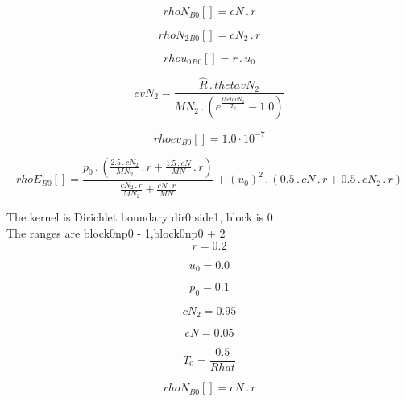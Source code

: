 \documentclass{article}
\begin{document}
\begin{dmath}{rhoN{_{B0}}}[{}] = cN \,.\, r\end{dmath}

\begin{dmath}{rhoN_{2}{_{B0}}}[{}] = cN_{2} \,.\, r\end{dmath}

\begin{dmath}{rhou_{0}{_{B0}}}[{}] = r \,.\, u_{0}\end{dmath}

\begin{dmath}evN_{2} = \frac{\hat{R} \,.\, thetavN_{2}}{MN_{2} \,.\, \left(e^{\frac{thetavN_{2}}{T_{0}}} - 1.0\right)}\end{dmath}

\begin{dmath}{rhoev{_{B0}}}[{}] = 1.0 \cdot 10^{-7}\end{dmath}

\begin{dmath}{rhoE{_{B0}}}[{}] = \frac{p_{0} \,.\, \left(\frac{2.5 \,.\, cN_{2}}{MN_{2}} \,.\, r + \frac{1.5 \,.\, cN}{MN} \,.\, r\right)}{\frac{cN_{2} \,.\, r}{MN_{2}} + \frac{cN \,.\, r}{MN}} + \left(u_{0} \right)^{2} \,.\, \left(0.5 \,.\, cN \,.\, 
r + 0.5 \,.\, cN_{2} \,.\, r\right)\end{dmath}

\noindent The kernel is Dirichlet boundary dir0 side1, block is 0\\\noindent The ranges are block0np0 - 1,block0np0 + 2\\\begin{dmath}r = 0.2\end{dmath}

\begin{dmath}u_{0} = 0.0\end{dmath}

\begin{dmath}p_{0} = 0.1\end{dmath}

\begin{dmath}cN_{2} = 0.95\end{dmath}

\begin{dmath}cN = 0.05\end{dmath}

\begin{dmath}T_{0} = \frac{0.5}{Rhat}\end{dmath}

\begin{dmath}{rhoN{_{B0}}}[{}] = cN \,.\, r\end{dmath}
\end{document}
